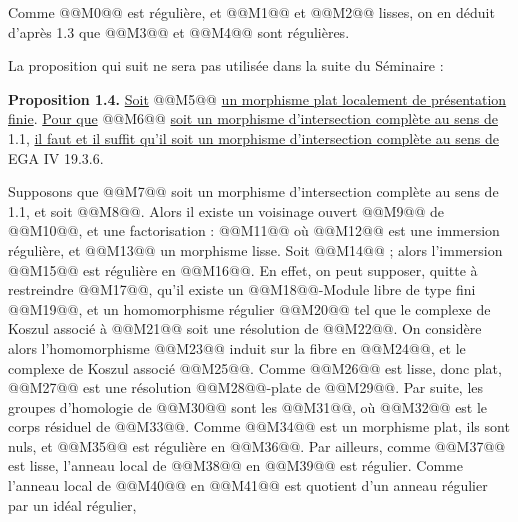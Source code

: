 
Comme @@M0@@ est régulière, et @@M1@@ et @@M2@@ lisses, on en déduit d'après 1.3 que @@M3@@ et @@M4@@ sont régulières.

La proposition qui suit ne sera pas utilisée dans la suite du Séminaire :

\textbf{Proposition 1.4.} \uline{Soit} @@M5@@ \uline{un morphisme plat localement de présentation finie}. \uline{Pour que} @@M6@@ \uline{soit un morphisme d'intersection complète au sens de} 1.1, \uline{il faut et il suffit qu'il soit un morphisme d'intersection complète au sens de} EGA IV 19.3.6.

Supposons que @@M7@@ soit un morphisme d'intersection complète au sens de 1.1, et soit @@M8@@. Alors il existe un voisinage ouvert @@M9@@ de @@M10@@, et une factorisation :
@@M11@@
où @@M12@@ est une immersion régulière, et @@M13@@ un morphisme lisse. Soit @@M14@@ ; alors l'immersion @@M15@@ est régulière en @@M16@@. En effet, on peut supposer, quitte à restreindre @@M17@@, qu'il existe un @@M18@@-Module libre de type fini @@M19@@, et un homomorphisme régulier @@M20@@ tel que le complexe de Koszul associé à @@M21@@ soit une résolution de @@M22@@. On considère alors l'homomorphisme @@M23@@ induit sur la fibre en @@M24@@, et le complexe de Koszul associé @@M25@@. Comme @@M26@@ est lisse, donc plat, @@M27@@ est une résolution @@M28@@-plate de @@M29@@. Par suite, les groupes d'homologie de @@M30@@ sont les @@M31@@, où @@M32@@ est le corps résiduel de @@M33@@. Comme @@M34@@ est un morphisme plat, ils sont nuls, et @@M35@@ est régulière en @@M36@@. Par ailleurs, comme @@M37@@ est lisse, l'anneau local de @@M38@@ en @@M39@@ est régulier. Comme l'anneau local de @@M40@@ en @@M41@@ est quotient d'un anneau régulier par un idéal régulier,
